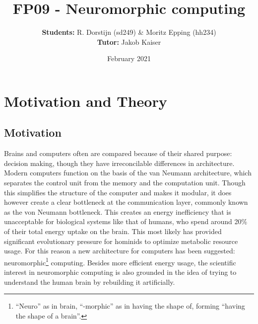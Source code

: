 \documentclass[a4paper,twocolumn]{article}
\title{FP09 - Neuromorphic computing}
\author{\textbf{Students: }R. Dorstijn (sd249) \& Moritz Epping (hh234) \\ \textbf{Tutor: }Jakob Kaiser}
\date{February 2021}
\begin{document}
\maketitle

\section{Motivation and Theory}
\subsection{Motivation}
Brains and computers often are compared because of their shared purpose:
decision making, though they have irreconcilable differences in architecture.
Modern computers function on the basis of the van Neumann
architecture\cite{von-Neumann}, which separates the control unit from the memory
and the computation unit. Though this simplifies the structure of the computer and
makes it modular, it does however create a clear bottleneck at the communication layer,
commonly known as the von Neumann bottleneck. This creates an energy
inefficiency that is unacceptable for biological systems like that of
humans, who spend around 20\% of their total energy uptake on the brain\cite{metabolic-rates}.
This most likely has provided significant evolutionary pressure for hominids to
optimize metabolic resource usage\cite{seymour2016fossil}.  For this reason a new
architecture for computers has been suggested: neuromorphic\footnote{``Neuro''
as in brain, ``-morphic'' as in having the shape of, forming ``having the shape
of a brain''.} computing.  Besides more efficient energy usage,  the scientific
interest in neuromorphic computing is also grounded in the idea of trying to
understand the human brain by rebuilding it artificially.
\end{document}
